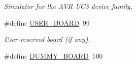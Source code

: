 \begin{DoxyCompactItemize}
\begin{DoxyCompactList}\small\item\em Simulator for the A\-V\-R U\-C3 device family. \end{DoxyCompactList}\item 
\hypertarget{group__group__common__boards_ga6e6dffe821337dbaaa12bca06e8e5119}{\#define \hyperlink{group__group__common__boards_ga6e6dffe821337dbaaa12bca06e8e5119}{U\-S\-E\-R\-\_\-\-B\-O\-A\-R\-D}~99}\label{group__group__common__boards_ga6e6dffe821337dbaaa12bca06e8e5119}

\begin{DoxyCompactList}\small\item\em User-\/reserved board (if any). \end{DoxyCompactList}\item 
\#define \hyperlink{group__group__common__boards_gac33d75ae101690822610338fdff2e95b}{D\-U\-M\-M\-Y\-\_\-\-B\-O\-A\-R\-D}~100
\end{DoxyCompactItemize}
